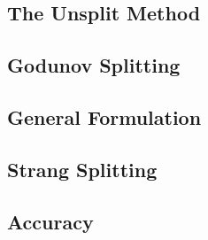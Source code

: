\documentclass{beamer}
\begin{document}
\subsection{The Unsplit Method}















\subsection{Godunov Splitting}














\subsection{General Formulation}

















\subsection{Strang Splitting}





















\subsection{Accuracy}
\end{document}
